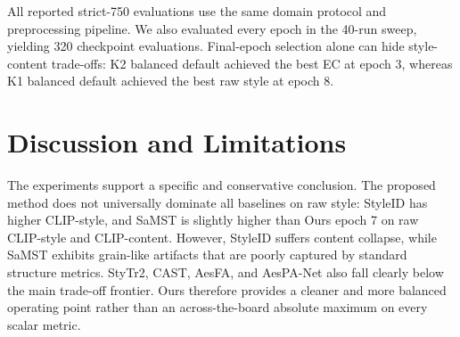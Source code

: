 ﻿\documentclass[letterpaper]{article}
\begin{document}
All reported strict-750 evaluations use the same domain protocol and preprocessing pipeline. We also evaluated every epoch in the 40-run sweep, yielding 320 checkpoint evaluations. Final-epoch selection alone can hide style-content trade-offs: K2 balanced default achieved the best EC at epoch 3, whereas K1 balanced default achieved the best raw style at epoch 8.

\begin{table}[t]
\centering
\caption{Unified efficiency profiling. ``Prof img/s'' measures latent-generator throughput under a common micro-benchmark, whereas ``E2E img/s'' measures the full strict-750 inference path including file I/O and decoding.}
\label{tab:runtime}
\end{table}

\section{Discussion and Limitations}
The experiments support a specific and conservative conclusion. The proposed method does not universally dominate all baselines on raw style: StyleID has higher CLIP-style, and SaMST is slightly higher than Ours epoch 7 on raw CLIP-style and CLIP-content. However, StyleID suffers content collapse, while SaMST exhibits grain-like artifacts that are poorly captured by standard structure metrics. StyTr2, CAST, AesFA, and AesPA-Net also fall clearly below the main trade-off frontier. Ours therefore provides a cleaner and more balanced operating point rather than an across-the-board absolute maximum on every scalar metric.
\end{document}

